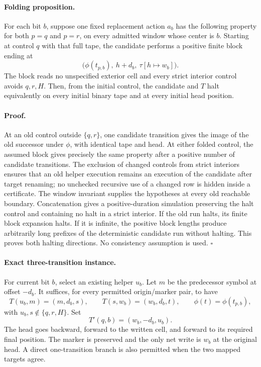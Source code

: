 \paragraph{Folding proposition.}
For each bit $b$, suppose one fixed replacement action $a_b$ has the following property for both $p=q$ and $p=r$, on every admitted window whose center is $b$. Starting at control $q$ with that full tape, the candidate performs a positive finite block ending at
\[
 \bigl(\phi(t_{p,b}),\ h+d_b,\ \tau[h\mapsto w_b]\bigr).
\]
The block reads no unspecified exterior cell and every strict interior control avoids $q,r,H$. Then, from the initial control, the candidate and $T$ halt equivalently on every initial binary tape and at every initial head position.

\paragraph{Proof.}
At an old control outside $\{q,r\}$, one candidate transition gives the image of the old successor under $\phi$, with identical tape and head. At either folded control, the assumed block gives precisely the same property after a positive number of candidate transitions. The exclusion of changed controls from strict interiors ensures that an old helper execution remains an execution of the candidate after target renaming; no unchecked recursive use of a changed row is hidden inside a certificate. The window invariant supplies the hypotheses at every old reachable boundary. Concatenation gives a positive-duration simulation preserving the halt control and containing no halt in a strict interior. If the old run halts, its finite block expansion halts. If it is infinite, the positive block lengths produce arbitrarily long prefixes of the deterministic candidate run without halting. This proves both halting directions. No consistency assumption is used. \hfill$\square$

\paragraph{Exact three-transition instance.}
For current bit $b$, select an existing helper $u_b$. Let $m$ be the predecessor symbol at offset $-d_b$. It suffices, for every permitted origin/marker pair, to have
\[
 T(u_b,m)=(m,d_b,s),\qquad
 T(s,w_b)=(w_b,d_b,t),\qquad
 \phi(t)=\phi(t_{p,b}),
\]
with $u_b,s\notin\{q,r,H\}$. Set
\[
 T'(q,b)=(w_b,-d_b,u_b).
\]
The head goes backward, forward to the written cell, and forward to its required final position. The marker is preserved and the only net write is $w_b$ at the original head. A direct one-transition branch is also permitted when the two mapped targets agree.

